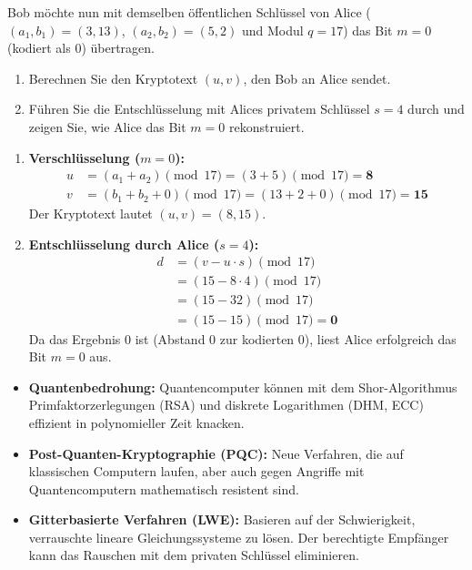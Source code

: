 \begin{myexercise}
	Bob möchte nun mit demselben öffentlichen Schlüssel von Alice ($(a_1, b_1) = (3, 13)$, $(a_2, b_2) = (5, 2)$ und Modul $q = 17$) das Bit $m = 0$ (kodiert als $0$) übertragen.
	\begin{enumerate}
		\item Berechnen Sie den Kryptotext $(u, v)$, den Bob an Alice sendet.
		\item Führen Sie die Entschlüsselung mit Alices privatem Schlüssel $s = 4$ durch und zeigen Sie, wie Alice das Bit $m = 0$ rekonstruiert.
	\end{enumerate}
	\begin{myanswer}
		\begin{enumerate}
			\item \textbf{Verschlüsselung ($m = 0$):}
			      \begin{align*}
				      u & = (a_1 + a_2) \pmod{17} = (3 + 5) \pmod{17} = \mathbf{8} \\
				      v & = (b_1 + b_2 + 0) \pmod{17} = (13 + 2 + 0) \pmod{17} = \mathbf{15}
			      \end{align*}
			      Der Kryptotext lautet $(u, v) = (8, 15)$.
			\item \textbf{Entschlüsselung durch Alice ($s = 4$):}
			      \begin{align*}
				      d & = (v - u \cdot s) \pmod{17} \\
				        & = (15 - 8 \cdot 4) \pmod{17} \\
				        & = (15 - 32) \pmod{17} \\
				        & = (15 - 15) \pmod{17} = \mathbf{0}
			      \end{align*}
			      Da das Ergebnis $0$ ist (Abstand $0$ zur kodierten $0$), liest Alice erfolgreich das Bit $m = 0$ aus.
		\end{enumerate}
	\end{myanswer}
\end{myexercise}

\begin{mysummary}
	\begin{itemize}
		\item \textbf{Quantenbedrohung:} Quantencomputer können mit dem Shor-Algorithmus Primfaktorzerlegungen (RSA) und diskrete Logarithmen (DHM, ECC) effizient in polynomieller Zeit knacken.
		\item \textbf{Post-Quanten-Kryptographie (\acrshort{PQC}):} Neue Verfahren, die auf klassischen Computern laufen, aber auch gegen Angriffe mit Quantencomputern mathematisch resistent sind.
		\item \textbf{Gitterbasierte Verfahren (LWE):} Basieren auf der Schwierigkeit, verrauschte lineare Gleichungssysteme zu lösen. Der berechtigte Empfänger kann das Rauschen mit dem privaten Schlüssel eliminieren.
	\end{itemize}
\end{mysummary}
